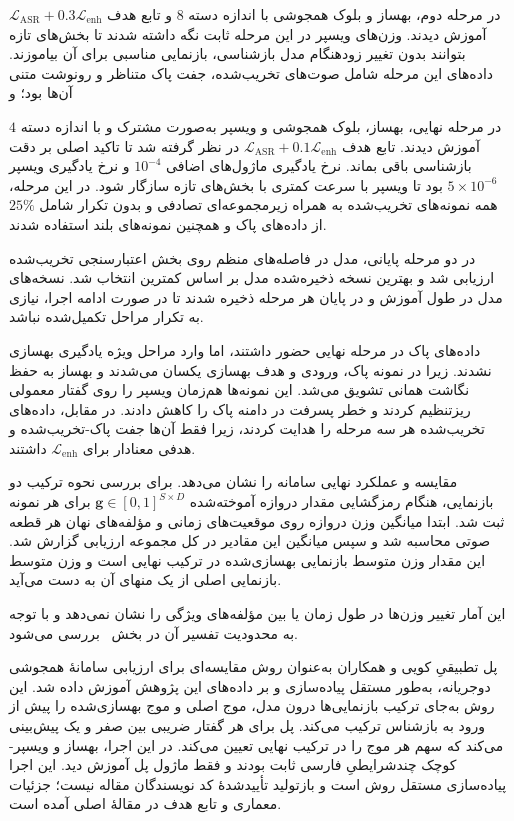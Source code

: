   در مرحله دوم، بهساز و بلوک همجوشی با اندازه دسته $8$ و تابع هدف $\mathcal{L}_{\mathrm{ASR}}+0.3\mathcal{L}_{\mathrm{enh}}$ آموزش دیدند. وزن‌های ویسپر در این مرحله ثابت نگه داشته شدند تا بخش‌های تازه بتوانند بدون تغییر زودهنگام مدل بازشناسی، بازنمایی مناسبی برای آن بیاموزند. داده‌های این مرحله شامل صوت‌های تخریب‌شده، جفت پاک متناظر و رونوشت متنی آن‌ها بود؛ و

  در مرحله نهایی، بهساز، بلوک همجوشی و ویسپر به‌صورت مشترک و با اندازه دسته $4$ آموزش دیدند. تابع هدف $\mathcal{L}_{\mathrm{ASR}}+0.1\mathcal{L}_{\mathrm{enh}}$ در نظر گرفته شد تا تاکید اصلی بر دقت بازشناسی باقی بماند. نرخ یادگیری ماژول‌های اضافی $10^{-4}$ و نرخ یادگیری ویسپر $5\times10^{-6}$ بود تا ویسپر با سرعت کمتری با بخش‌های تازه سازگار شود. در این مرحله، همه نمونه‌های تخریب‌شده به همراه زیرمجموعه‌ای تصادفی و بدون تکرار شامل $25\%$ از داده‌های پاک و همچنین نمونه‌های بلند استفاده شدند.

در دو مرحله پایانی، مدل در فاصله‌های منظم روی بخش اعتبارسنجی تخریب‌شده ارزیابی شد و بهترین نسخه ذخیره‌شده مدل بر اساس کمترین  انتخاب شد. نسخه‌های مدل در طول آموزش و در پایان هر مرحله ذخیره شدند تا در صورت ادامه اجرا، نیازی به تکرار مراحل تکمیل‌شده نباشد.

داده‌های پاک در مرحله نهایی حضور داشتند، اما وارد مراحل ویژه یادگیری بهسازی نشدند. زیرا در نمونه پاک، ورودی و هدف بهسازی یکسان می‌شدند و بهساز به حفظ نگاشت همانی تشویق می‌شد. این نمونه‌ها هم‌زمان ویسپر را روی گفتار معمولی ریزتنظیم کردند و خطر پسرفت در دامنه پاک را کاهش دادند. در مقابل، داده‌های تخریب‌شده هر سه مرحله را هدایت کردند، زیرا فقط آن‌ها جفت پاک-تخریب‌شده و هدفی معنادار برای $\mathcal{L}_{\mathrm{enh}}$ داشتند.


مقایسه  و  عملکرد نهایی سامانه را نشان می‌دهد. برای بررسی نحوه ترکیب دو بازنمایی، هنگام رمزگشایی مقدار دروازه آموخته‌شده $\mathbf{g}\in[0,1]^{S\times D}$ برای هر نمونه ثبت شد. ابتدا میانگین وزن دروازه روی موقعیت‌های زمانی و مؤلفه‌های نهان هر قطعه صوتی محاسبه شد و سپس میانگین این مقادیر در کل مجموعه ارزیابی گزارش شد. این مقدار وزن متوسط بازنمایی بهسازی‌شده در ترکیب نهایی است و وزن متوسط بازنمایی اصلی از یک منهای آن به دست می‌آید.

این آمار تغییر وزن‌ها در طول زمان یا بین مؤلفه‌های ویژگی را نشان نمی‌دهد و با توجه به محدودیت تفسیر آن در بخش~ بررسی می‌شود.

پل تطبیقیِ کویی و همکاران  به‌عنوان روش مقایسه‌ای برای ارزیابی سامانهٔ همجوشی دوجریانه، به‌طور مستقل پیاده‌سازی و بر داده‌های این پژوهش آموزش داده شد. این روش به‌جای ترکیب بازنمایی‌ها درون مدل، موج اصلی و موج بهسازی‌شده را پیش از ورود به بازشناس ترکیب می‌کند. پل برای هر گفتار ضریبی بین صفر و یک پیش‌بینی می‌کند که سهم هر موج را در ترکیب نهایی تعیین می‌کند. در این اجرا، بهساز  و ویسپر-کوچک چندشرایطیِ فارسی ثابت بودند و فقط ماژول پل آموزش دید. این اجرا پیاده‌سازی مستقل روش است و بازتولید تأییدشدهٔ کد نویسندگان مقاله نیست؛ جزئیات معماری و تابع هدف در مقالهٔ اصلی آمده است.

